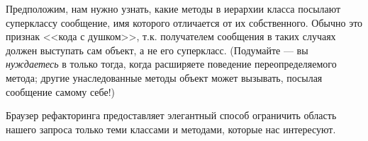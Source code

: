 \documentclass[a4paper,10pt,twoside]{book}
\begin{document}
Предположим, нам нужно узнать, какие методы в иерархии класса  посылают суперклассу сообщение, имя которого отличается от их собственного.
Обычно это признак <<кода с душком>>, т.к. получателем сообщения в таких случаях должен выступать сам объект, а не его суперкласс. (Подумайте --- вы \emph{нуждаетесь} в \super только тогда, когда расширяете поведение переопределяемого метода; другие унаследованные методы объект может вызывать, посылая сообщение самому себе!)

Браузер рефакторинга предоставляет элегантный способ ограничить область нашего запроса только теми классами и методами, которые нас интересуют.

\dothis{Откройте в браузере класс \ct{Collection}.
\actclick на имени класса и выберете \menu{refactoring scope>subclasses with}.
Откроется новое окружение браузера, ограниченное только иерархией класса \ct{Collection}.
Внутри этого окружения выберете \menu{refactoring scope>super-sends}, чтобы открыть новое окружение со всеми методами внутри иерархии класса \ct{Collectuon}, посылающими сообщения суперклассу.
Теперь \click на любом методе и выберете \menu{refactor>code critics}.
Затем перейдите к \menu{Lint checks>Possible bugs>Sends different super message} и \actclick, чтобы выбрать \menu{browse}.}
\end{document}
